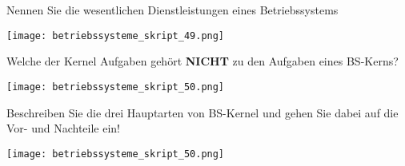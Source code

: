 \documentclass{article}
\begin{document}
\begin{tcolorbox}[colback=white!10!white,colframe=lightgray!75!black,
  savelowerto=\jobname_ex.tex,breakable,enhanced,lines before break=40]

\begin{center}
Nennen Sie die wesentlichen Dienstleistungen eines Betriebssystems

\end{center}

\tcblower

\justifying
\begin{center}
\texttt{[image: betriebssysteme\_skript\_49.png]}
\end{center}

\end{tcolorbox}
\begin{tcolorbox}[colback=white!10!white,colframe=lightgray!75!black,
  savelowerto=\jobname_ex.tex,breakable,enhanced,lines before break=40]

\begin{center}
Welche der Kernel Aufgaben gehört 
\textbf{NICHT
} zu den Aufgaben eines BS-Kerns?

\end{center}

\tcblower

\justifying
\begin{center}
\texttt{[image: betriebssysteme\_skript\_50.png]}
\end{center}

\end{tcolorbox}
\begin{tcolorbox}[colback=white!10!white,colframe=lightgray!75!black,
  savelowerto=\jobname_ex.tex,breakable,enhanced,lines before break=40]

\begin{center}
Beschreiben Sie die drei Hauptarten von BS-Kernel und gehen Sie dabei auf die Vor- und Nachteile ein!

\end{center}

\tcblower

\justifying
\begin{center}
\texttt{[image: betriebssysteme\_skript\_50.png]}
\end{center}

\end{tcolorbox}
\end{document}
